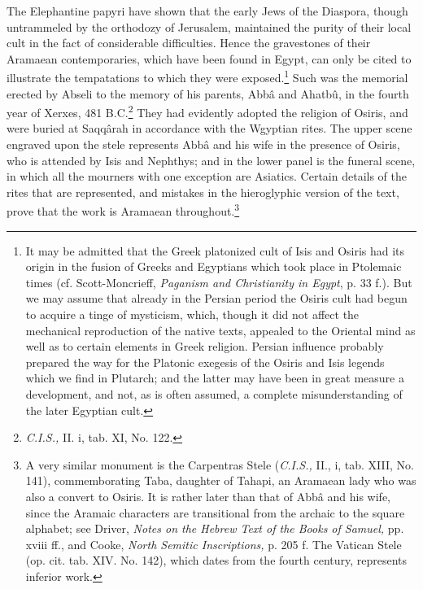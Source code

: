\documentclass[12pt,oneside]{book}
\begin{document}
The Elephantine papyri have shown that the early Jews of the Diaspora, though untrammeled by the orthodozy of Jerusalem, maintained the purity of their local cult in the fact of considerable difficulties. Hence the gravestones of their Aramaean contemporaries, which have been found in Egypt, can only be cited to illustrate the tempatations to which they were exposed.\footnote{It may be admitted that the Greek platonized cult of Isis and Osiris had its origin in the fusion of Greeks and Egyptians which took place in Ptolemaic times (cf. Scott-Moncrieff, \textit{Paganism and Christianity in Egypt}, p. 33 f.). But we may assume that already in the Persian period the Osiris cult had begun to acquire a tinge of mysticism, which, though it did not affect the mechanical reproduction of the native texts, appealed to the Oriental mind as well as to certain elements in Greek religion. Persian influence probably prepared the way for the Platonic exegesis of the Osiris and Isis legends which we find in Plutarch; and the latter may have been in great measure a development, and not, as is often assumed, a complete misunderstanding of the later Egyptian cult.} Such was the memorial erected by Abseli to the memory of his parents, Abb\^a and Ahatb\^u, in the fourth year of Xerxes, 481 B.C.\footnote{\textit{C.I.S.,} II. i, tab. XI, No. 122.} They had evidently adopted the religion of Osiris, and were buried at Saqq\^arah in accordance with the Wgyptian rites. The upper scene engraved upon the stele represents Abb\^a and his wife in the presence of Osiris, who is attended by Isis and Nephthys; and in the lower panel is the funeral scene, in which all the mourners with one exception are Asiatics. Certain details of the rites that are represented, and mistakes in the hieroglyphic version of the text, prove that the work is Aramaean throughout.\footnote{A very similar monument is the Carpentras Stele (\textit{C.I.S.,} II., i, tab. XIII, No. 141), commemborating Taba, daughter of Tahapi, an Aramaean lady who was also a convert to Osiris. It is rather later than that of Abb\^a and his wife, since the Aramaic characters are transitional from the archaic to the square alphabet; see Driver, \textit{Notes on the Hebrew Text of the Books of Samuel,} pp. xviii ff., and Cooke, \textit{North Semitic Inscriptions,} p. 205 f. The Vatican Stele (op. cit. tab. XIV. No. 142), which dates from the fourth century, represents inferior work.} \par 
\end{document}
